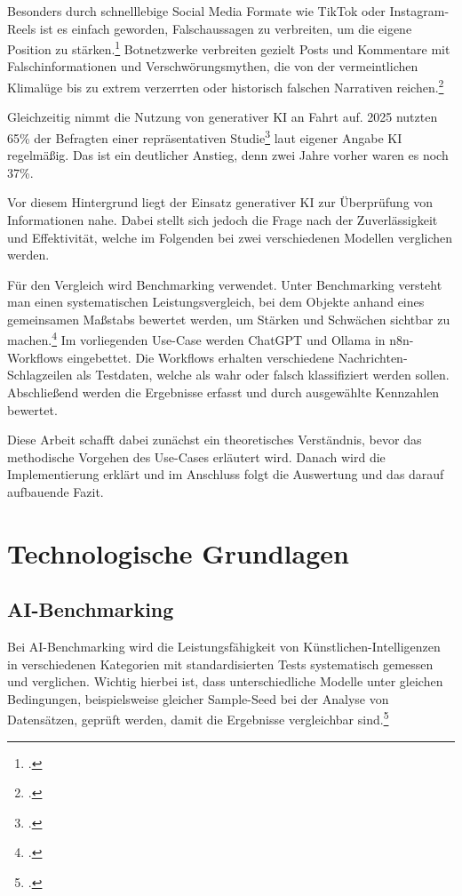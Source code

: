 \documentclass[12pt,a4paper]{article}
\begin{document}
    Besonders durch schnelllebige Social Media Formate wie TikTok oder Instagram-Reels ist es einfach geworden,
    Falschaussagen zu verbreiten, um die eigene Position zu stärken.\footnote{\cite[S.~10]{Nim}.} Botnetzwerke
    verbreiten gezielt Posts und Kommentare mit Falschinformationen und Verschwörungsmythen, die von der vermeintlichen
    Klimalüge bis zu extrem verzerrten oder historisch falschen Narrativen reichen.\footnote{\cite{Bsi}.}

    Gleichzeitig nimmt die Nutzung von generativer KI an Fahrt auf. 2025 nutzten 65\% der Befragten einer
    repräsentativen Studie\footnote{\cite{TV-Verband}.} laut eigener Angabe KI regelmäßig. Das ist ein deutlicher
    Anstieg, denn zwei Jahre vorher waren es noch 37\%.

    Vor diesem Hintergrund liegt der Einsatz generativer KI zur Überprüfung von Informationen nahe. Dabei stellt sich
    jedoch die Frage nach der Zuverlässigkeit und Effektivität, welche im Folgenden bei zwei verschiedenen Modellen
    verglichen werden.


    Für den Vergleich wird Benchmarking verwendet. Unter Benchmarking versteht man einen systematischen
    Leistungsvergleich, bei dem Objekte anhand eines gemeinsamen Maßstabs bewertet werden, um Stärken und Schwächen
    sichtbar zu machen.\footnote{\cite{WirtschaftslexikonGabler}.} Im vorliegenden Use-Case werden ChatGPT und Ollama
    in n8n-Workflows eingebettet. Die Workflows erhalten verschiedene Nachrichten-Schlagzeilen als Testdaten, welche als
    wahr oder falsch klassifiziert werden sollen. Abschließend werden die Ergebnisse erfasst und durch ausgewählte
    Kennzahlen bewertet.

    Diese Arbeit schafft dabei zunächst ein theoretisches Verständnis, bevor das methodische Vorgehen des
    Use-Cases erläutert wird. Danach wird die Implementierung erklärt und im Anschluss folgt die Auswertung und das
    darauf aufbauende Fazit.


    \section{Technologische Grundlagen}

    \subsection{AI-Benchmarking}
    Bei AI-Benchmarking wird die Leistungsfähigkeit von Künstlichen-Intelligenzen in verschiedenen Kategorien mit standardisierten Tests systematisch gemessen und verglichen. Wichtig hierbei ist, dass unterschiedliche Modelle unter gleichen Bedingungen, beispielsweise gleicher Sample-Seed bei der Analyse von Datensätzen, geprüft werden, damit die Ergebnisse vergleichbar sind.\footcite[5]{Benchmarking-AI-Models-in-Software-Engineering}
\end{document}
